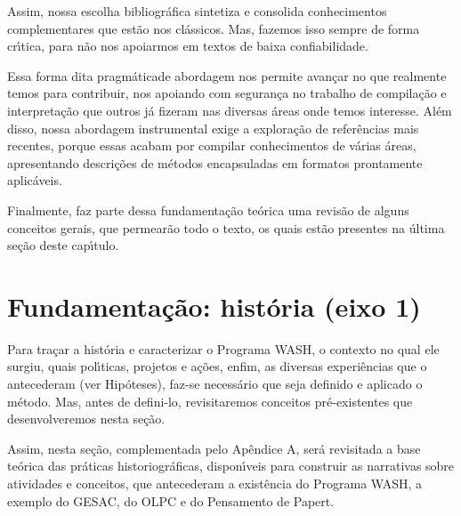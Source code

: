 \documentclass[
12pt,		%
openright,	%
twoside,  %
a4paper,			%
chapter=TITLE,		%
english,			%
french,				%
spanish,			%
brazil				%
]{USPSC-classe/USPSC}
\begin{document}
Assim, nossa escolha bibliogr\'afica sintetiza e consolida conhecimentos complementares que est\~ao nos cl\'assicos. Mas, fazemos isso sempre de forma cr\'{\i}tica, para n\~ao nos apoiarmos em textos de baixa confiabilidade.









Essa forma dita \textquotedbl pragm\'atica\textquotedbl  de abordagem nos permite avan\c{c}ar no que realmente temos para contribuir, nos apoiando com seguran\c{c}a no trabalho de compila\c{c}\~ao e interpreta\c{c}\~ao que outros j\'a fizeram nas diversas \'areas onde temos interesse. Al\'em disso, nossa abordagem instrumental exige a explora\c{c}\~ao de refer\^encias mais recentes, porque essas acabam por compilar conhecimentos de v\'arias \'areas, apresentando descri\c{c}\~oes de m\'etodos encapsuladas em formatos prontamente aplic\'aveis.









Finalmente, faz parte dessa fundamenta\c{c}\~ao te\'orica uma revis\~ao de alguns conceitos gerais, que permear\~ao todo o texto, os quais est\~ao presentes na \'ultima se\c{c}\~ao deste cap\'{\i}tulo.









\section[Fundamenta\c{c}\~ao: hist\'oria (eixo 1)]{Fundamenta\c{c}\~ao: hist\'oria (eixo 1)}\label{Fundamenta\c{c}\~ao: hist\'oria (eixo 1)}
Para tra\c{c}ar a hist\'oria e caracterizar o Programa WASH, o contexto no qual ele surgiu, quais pol\'{\i}ticas, projetos e a\c{c}\~oes, enfim, as diversas experi\^encias que o antecederam (ver Hip\'oteses), faz-se  necess\'ario que seja definido e aplicado o m\'etodo. Mas, antes de defini-lo, revisitaremos conceitos pr\'e-existentes que  desenvolveremos nesta se\c{c}\~ao.









Assim, nesta se\c{c}\~ao, complementada pelo Ap\^endice A, ser\'a revisitada a base te\'orica das pr\'aticas historiogr\'aficas, dispon\'{\i}veis para construir as narrativas sobre atividades e conceitos, que antecederam a exist\^encia do Programa WASH, a exemplo do GESAC, do OLPC e do Pensamento de Papert.
\end{document}
